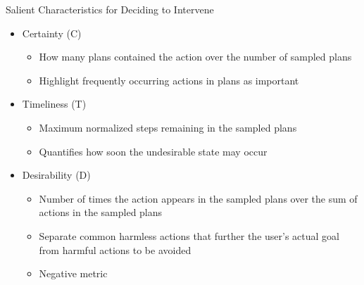%


\begin{frame}{Salient Characteristics for Deciding to Intervene}
	\begin{itemize}
		\item Certainty (C)
		\begin{itemize}
			\item How many plans contained the action over the number of sampled plans
			\item Highlight frequently occurring actions in plans as important
		\end{itemize}
		
		\item Timeliness (T)
			\begin{itemize}
				\item Maximum normalized steps remaining in the sampled plans
				\item Quantifies how soon the undesirable state may occur
			\end{itemize}
		
		\item Desirability (D)	
		\begin{itemize}
			\item Number of times the action appears in the sampled plans over the sum of actions in the sampled plans
			\item Separate common harmless actions that further the user’s actual goal from harmful actions to be avoided
			\item Negative metric
		\end{itemize}
		
	\end{itemize}
\end{frame}


